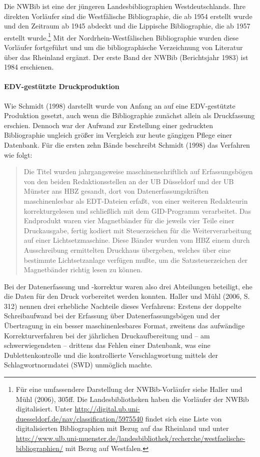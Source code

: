 \documentclass[a4paper,
fontsize=11pt,
oneside,
numbers=noperiodatend,
parskip=half-,
bibliography=totoc,
final
]{scrartcl}
\begin{document}
Die NWBib ist eine der jüngeren Landesbibliographien Westdeutschlands.
Ihre direkten Vorläufer sind die Westfälische Bibliographie, die ab 1954
erstellt wurde und den Zeitraum ab 1945 abdeckt und die Lippische
Bibliographie, die ab 1957 erstellt wurde.\footnote{Für eine
  umfassendere Darstellung der NWBib-Vorläufer siehe Haller und Mühl
  (2006), 305ff. Die Landesbibliotheken haben die Vorläufer der NWBib
  digitalisiert. Unter
  \url{http://digital.ub.uni-duesseldorf.de/nav/classification/5975540}
  findet sich eine Liste von digitalisierten Bibliographien mit Bezug
  auf das Rheinland und unter
  \url{http://www.ulb.uni-muenster.de/landesbibliothek/recherche/westfaelische-bibliographien/}
  mit Bezug auf Westfalen.} Mit der Nord\-rhein-West\-fälischen
Bibliographie wurden diese Vorläufer fortgeführt und um die
bibliographische Verzeichnung von Literatur über das Rheinland ergänzt.
Der erste Band der NWBib (Berichtsjahr 1983) ist 1984 erschienen.

\paragraph{EDV-gestützte
Druckproduktion}\label{edv-gestuxfctzte-druckproduktion}

Wie Schmidt (1998) darstellt wurde von Anfang an auf eine EDV-gestützte
Produktion gesetzt, auch wenn die Bibliographie zunächst allein als
Druckfassung erschien. Dennoch war der Aufwand zur Erstellung einer
gedruckten Bibliographie ungleich größer im Vergleich zur heute gängigen
Pflege einer Datenbank. Für die ersten zehn Bände beschreibt Schmidt
(1998) das Verfahren wie folgt:

\begin{quote}
Die Titel wurden jahrgangsweise maschinenschriftlich auf Erfassungsbögen
von den beiden Redaktionsstellen an der UB Düsseldorf und der UB Münster
ans HBZ gesandt, dort von Datenerfassungskräften maschinenlesbar als
EDT-Dateien erfaßt, von einer weiteren Redakteurin korrekturgelesen und
schließlich mit dem GID-Programm verarbeitet. Das Endprodukt waren vier
Magnetbänder für die jeweils vier Teile einer Druckausgabe, fertig
kodiert mit Steuerzeichen für die Weiterverarbeitung auf einer
Lichtsetzmaschine. Diese Bänder wurden vom HBZ einem durch Ausschreibung
ermittelten Druckhaus übergeben, welches über eine bestimmte
Lichtsetzanlage verfügen mußte, um die Satzsteuerzeichen der
Magnetbänder richtig lesen zu können.
\end{quote}

Bei der Datenerfassung und -korrektur waren also drei Abteilungen
beteiligt, ehe die Daten für den Druck vorbereitet werden konnten.
Haller und Mühl (2006, S. 312) nennen drei erhebliche Nachteile dieses
Verfahrens: Erstens der doppelte Schreibaufwand bei der Erfassung über
Datenerfassungsbögen und der Übertragung in ein besser maschinenlesbares
Format, zweitens das aufwändige Korrekturverfahren bei der jährlichen
Druckaufbereitung und -- am schwerwiegendsten -- drittens das Fehlen
einer Datenbank, was eine Dublettenkontrolle und die kontrollierte
Verschlagwortung mittels der Schlagwortnormdatei (SWD) unmöglich machte.
\end{document}
